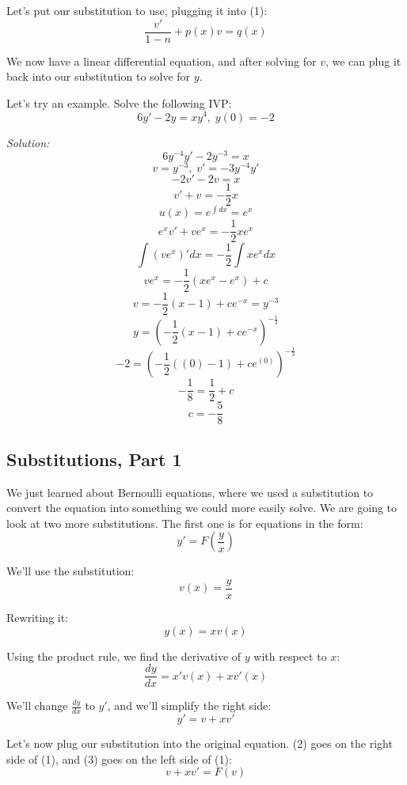 Let's put our substitution to use, plugging it into (1):
$$\frac{v'}{1 - n} + p(x)v = q(x)$$

We now have a linear differential equation, and after solving for $v$, we can plug it back into our substitution to solve for $y$.

\pagebreak

Let's try an example. Solve the following IVP:
$$6y' - 2y = xy^{4},\; y(0) = -2$$

\textit{Solution:}
$$6y^{-4}y' - 2y^{-3} = x$$
$$v = y^{-3},\; v' = -3y^{-4}y'$$
$$-2v' - 2v = x$$
$$v' + v = -\frac{1}{2}x$$
$$u(x) = e^{\int dx} = e^{x}$$
$$e^{x}v' + ve^{x} = -\frac{1}{2}xe^{x}$$
$$\int (ve^{x})'dx = -\frac{1}{2}\int xe^{x}dx$$
$$ve^{x} = -\frac{1}{2}(xe^{x} - e^{x}) + c$$
$$v = -\frac{1}{2}(x - 1) + ce^{-x} = y^{-3}$$
$$y = \left(-\frac{1}{2}(x - 1) + ce^{-x}\right)^{-\frac{1}{3}}$$
$$-2 = \left(-\frac{1}{2}((0) - 1) + ce^{(0)}\right)^{-\frac{1}{3}}$$
$$-\frac{1}{8} = \frac{1}{2} + c$$
$$c = -\frac{5}{8}$$
\begin{center}
\end{center}

\subsection{Substitutions, Part 1}
We just learned about Bernoulli equations, where we used a substitution to convert the equation into something we could more easily solve. We are going to look at two more substitutions. The first one is for equations in the form:
\begin{equation}
	y' = F\left(\frac{y}{x}\right)
\end{equation}

We'll use the substitution:
\begin{equation}
	v(x) = \frac{y}{x}
\end{equation}

Rewriting it:
$$y(x) = xv(x)$$

Using the product rule, we find the derivative of $y$ with respect to $x$:
$$\frac{dy}{dx} = x'v(x) + xv'(x)$$

We'll change $\frac{dy}{dx}$ to $y'$, and we'll simplify the right side:
\begin{equation}
	y' = v + xv'
\end{equation}

Let's now plug our substitution into the original equation. (2) goes on the right side of (1), and (3) goes on the left side of (1):
$$v + xv' = F(v)$$

